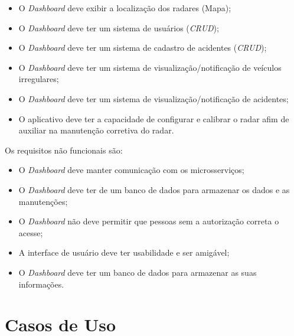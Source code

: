 \begin{itemize}
    \item O \textit{Dashboard} deve exibir a localização dos radares (Mapa);
\end{itemize}

\begin{itemize}
    \item O \textit{Dashboard} deve ter um sistema de usuários (\textit{CRUD});
\end{itemize}


\begin{itemize}
    \item O \textit{Dashboard} deve ter um sistema de cadastro de acidentes (\textit{CRUD});
\end{itemize}

\begin{itemize}
    \item O \textit{Dashboard} deve ter um sistema de visualização/notificação de veículos irregulares;
\end{itemize}

\begin{itemize}
    \item O \textit{Dashboard} deve ter um sistema de visualização/notificação de acidentes;
\end{itemize}

\begin{itemize}
    \item O aplicativo deve ter a capacidade de configurar e calibrar o radar afim de auxiliar na manutenção corretiva do radar.
\end{itemize}

Os requisitos não funcionais são:

\begin{itemize}
    \item O \textit{Dashboard} deve manter comunicação com os microsserviços;
    \item O \textit{Dashboard} deve ter de um banco de dados para armazenar os dados e as manutenções;
    \item O \textit{Dashboard} não deve permitir que pessoas sem a autorização correta o acesse;
    \item A interface de usuário deve ter usabilidade e ser amigável;
    \item O \textit{Dashboard} deve ter um banco de dados para armazenar as suas informações.
\end{itemize}

\section{Casos de Uso}

